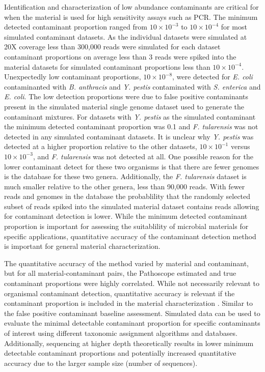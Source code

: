 \documentclass[fleqn,10pt,lineno]{wlpeerj}\usepackage[]{graphicx}\usepackage[]{color}
\begin{document}
Identification and characterization of low abundance contaminants are critical for when the material is used for high sensitivity assays such as PCR. 
The minimum detected contaminant proportion ranged from $10 \times 10^{-3}$ to $10 \times 10^{-4}$ for most simulated contaminant datasets. 
As the individual datasets were simulated at 20X coverage less than 300,000 reads were simulated for each dataset contaminant proportions on average less than 3 reads were spiked into the material datasets for simulated contaminant proportions less than $10 \times 10^{-4}$. 
Unexpectedly low contaminant proportions, $10 \times 10^{-8}$, were detected for \textit{E. coli} contaminanted with \textit{B. anthracis} and \textit{Y. pestis} contaminated with \textit{S. enterica} and \textit{E. coli}. 
The low detection proportions were due to false positive contaminants present in the simulated material single genome dataset used to generate the contaminant mixtures. 
For datasets with \textit{Y. pestis} as the simulated contaminant the minimum detected contaminant proportion was 0.1 and \textit{F. tularensis} was not detected in any simulated contaminant datasets. 
It is unclear why \textit{Y. pestis} was detected at a higher proportion relative to the other datasets, $10 \times 10^{-1}$ versus $10 \times 10^{-3}$, and \textit{F. tularensis} was not detected at all. 
One possible reason for the lower contaminant detect for these two organisms is that there are fewer genomes is the database for these two genera. 
Additionally, the \textit{F. tularensis} dataset is much smaller relative to the other genera, less than 90,000 reads. 
With fewer reads and genomes in the database the probablility that the randomly selected subset of reads spiked into the simulated material dataset contains reads allowing for contaminant detection is lower. 
While the minimum detected contaminant proportion is important for assessing the suitablility of microbial materials for specific applications, quantitative accuracy of the contaminant detection method is important for general material characterization.


The quantitative accuracy of the method varied by material and contaminant, but for all material-contaminant pairs, the Pathoscope estimated and true contaminant proportions were highly correlated. 
While not necessarily relevant to organismal contaminant detection, quantitative accuracy is relevant if the contaminant proportion is included in the material characterization \citep{olson2016pepr}.  
Similar to the false positive contaminant baseline assessment. 
Simulated data can be used to evaluate the minimal detectable contaminant proportion for specific contaminants of interest using different taxonomic assignment algorithms and databases. 
Additionally, sequencing at higher depth theoretically results in lower minimum detectable contaminant proportions and potentially increased quantitative accuracy due to the larger sample size (number of sequences).
\end{document}
